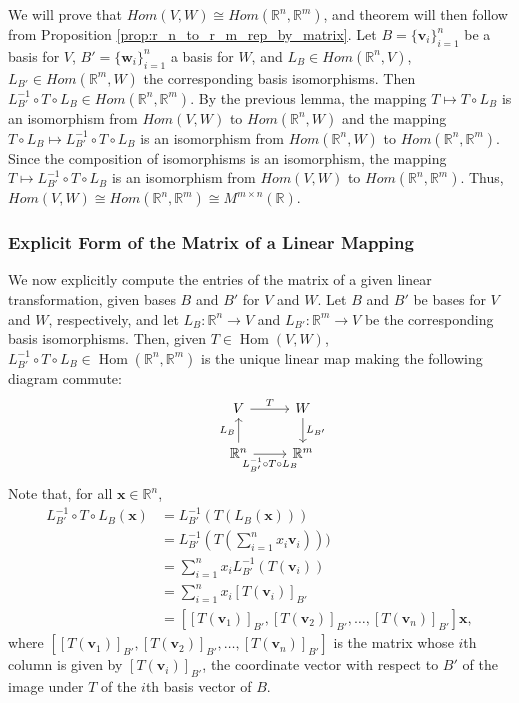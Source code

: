 \documentclass[12pt,letterpaper,reqno]{article}
\numberwithin{equation}{section}
\newcommand{\R}{\ensuremath{\mathbb R}}
\newcommand{\bv}{\mathbf{v}}
\newcommand{\bw}{\mathbf{w}}
\newcommand{\bx}{\mathbf{x}}
\DeclareMathOperator{\Hom}{Hom}
\begin{document}
\begin{pf}
	We will prove that $Hom(V,W) \cong Hom(\mathbb{R}^n, \mathbb{R}^m)$, and theorem will then follow from Proposition \ref{prop:r_n_to_r_m_rep_by_matrix}. Let $B=\{\bv_i\}_{i=1}^n$ be a basis for $V$, $B'=\{\bw_i\}_{i=1}^n$ a basis for $W$, and $L_B \in Hom(\mathbb{R}^n,V)$, $L_{B'} \in Hom(\mathbb{R}^m,W)$ the corresponding basis isomorphisms. Then $L_{B'}^{-1} \circ T \circ L_B \in Hom(\mathbb{R}^n,\mathbb{R}^m)$. By the previous lemma, the mapping $T \mapsto T \circ L_B$ is an isomorphism from $Hom(V,W)$ to $Hom(\mathbb{R}^n,W)$ and the mapping $T \circ L_B \mapsto L_{B'}^{-1} \circ T \circ L_B$ is an isomorphism from $Hom(\mathbb{R}^n,W)$ to $Hom(\mathbb{R}^n,\mathbb{R}^m)$. Since the composition of isomorphisms is an isomorphism, the mapping $T \mapsto L_{B'}^{-1} \circ T \circ L_B$ is an isomorphism from $Hom(V,W)$ to $Hom(\mathbb{R}^n,\mathbb{R}^m)$. Thus, $Hom(V,W)\cong Hom(\mathbb{R}^n,\mathbb{R}^m) \cong M^{m \times n}(\R)$.
\end{pf}
\subsubsection{Explicit Form of the Matrix of a Linear Mapping}
We now explicitly compute the entries of the matrix of a given linear transformation, given bases $B$ and $B'$ for $V$ and $W$. Let $B$ and $B'$ be bases for $V$ and $W$, respectively, and let $L_B:\R^n \to V$ and  $L_{B'}:\R^m \to V$ be the corresponding basis isomorphisms. Then, given $T \in \Hom(V,W)$, $L_{B'}^{-1} \circ T \circ L_B \in \Hom(\R^n,\R^m)$ is the unique linear map making the following diagram commute:
\begin{equation*}
	\begin{tikzcd}
	& V  \arrow[r,"T"] & W\\
	& \R^n  \arrow[u,"L_B"]  \arrow[r,swap,"L_{B'}^{-1} \circ T \circ L_B"] &  \R^m \arrow[u,leftarrow,swap,"L_{B'}"]	
	\end{tikzcd}
\end{equation*}
Note that, for all $\bx \in \R^n$,
\begin{align*}
	L_{B'}^{-1} \circ T \circ L_B(\bx)&=L_{B'}^{-1}(T(L_B(\bx))) \\
	&=L_{B'}^{-1}(T(\sum_{i=1}^nx_i\bv_i))) \\
	&=\sum_{i=1}^nx_iL_{B'}^{-1}(T(\bv_i)) \\
	&=\sum_{i=1}^nx_i[T(\bv_i)]_{B'} \\
	&=[[T(\bv_1)]_{B'}, [T(\bv_2)]_{B'},\dots, [T(\bv_n)]_{B'}]\bx,
\end{align*}
where $[[T(\bv_1)]_{B'}, [T(\bv_2)]_{B'},\dots, [T(\bv_n)]_{B'}]$ is the matrix whose $i$th column is given by $[T(\bv_i)]_{B'}$, the coordinate vector with respect to $B'$ of the image under $T$ of the $i$th basis vector of $B$.
\end{document}

